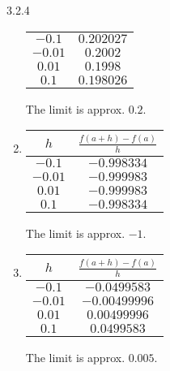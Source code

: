 \begin{Answer}{3.2.4}
\begin{enumerate}
{\begin{tabular}{cc}
 $ -0.1$ & $0.202027$ \\
 $-0.01$ & $0.2002$ \\
 $0.01$ & $0.1998$ \\
 $0.1$ & $0.198026$
\end{tabular}
The limit is approx. $0.2$.
}
\item
{\begin{tabular}{cc}
$h$ & $\frac{f(a+h)-f(a)}{h}$ \\ \hline
 $ -0.1$ & $-0.998334$ \\
 $-0.01$ & $-0.999983$ \\
 $0.01$ & $-0.999983$ \\
 $0.1$ & $-0.998334$
\end{tabular}
The limit is approx. $-1$.
}
\item {\begin{tabular}{cc}
$h$ & $\frac{f(a+h)-f(a)}{h}$\\ \hline
 $-0.1$ & $-0.0499583$ \\
 $-0.01$ & $-0.00499996$ \\
 $0.01$ & $0.00499996$ \\
 $0.1$ & $0.0499583$
\end{tabular}
The limit is approx. $0.005$.
}
\end{enumerate}
\end{Answer}
